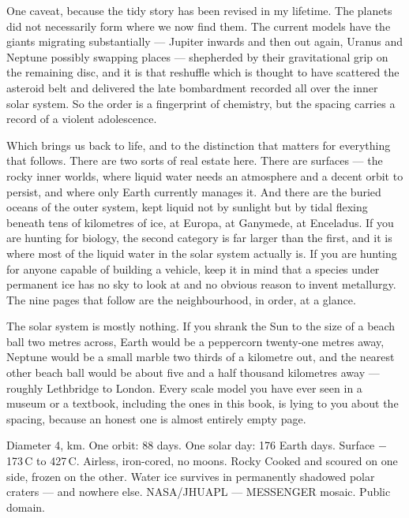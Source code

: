 One caveat, because the tidy story has been revised in my lifetime. The planets did not
necessarily form where we now find them. The current models have the giants migrating
substantially --- Jupiter inwards and then out again, Uranus and Neptune possibly swapping
places --- shepherded by their gravitational grip on the remaining disc, and it is that
reshuffle which is thought to have scattered the asteroid belt and delivered the late
bombardment recorded all over the inner solar system. So the order is a fingerprint of
chemistry, but the spacing carries a record of a violent adolescence.

Which brings us back to life, and to the distinction that matters for everything that follows.
There are two sorts of real estate here. There are surfaces --- the rocky inner worlds, where
liquid water needs an atmosphere and a decent orbit to persist, and where only Earth currently
manages it. And there are the buried oceans of the outer system, kept liquid not by sunlight
but by tidal flexing beneath tens of kilometres of ice, at Europa, at Ganymede, at Enceladus.
If you are hunting for biology, the second category is far larger than the first, and it is
where most of the liquid water in the solar system actually is. If you are hunting for anyone
capable of building a vehicle, keep it in mind that a species under permanent ice has no sky
to look at and no obvious reason to invent metallurgy. The nine pages that follow are the
neighbourhood, in order, at a glance.

\begin{funfact}
The solar system is mostly nothing. If you shrank the Sun to the size of a beach ball two
metres across, Earth would be a peppercorn twenty-one metres away, Neptune would be a small
marble two thirds of a kilometre out, and the nearest other beach ball would be about five and
a half thousand kilometres away --- roughly Lethbridge to London. Every scale model you have
ever seen in a museum or a textbook, including the ones in this book, is lying to you about the
spacing, because an honest one is almost entirely empty page.
\end{funfact}

{Diameter 4, km. One orbit: 88 days. One solar day: 176 Earth days. Surface
$-$173\,\textdegree C to 427\,\textdegree C. Airless, iron-cored, no moons.}
{Rocky}
{Cooked and scoured on one side, frozen on the other. Water ice survives in permanently
shadowed polar craters --- and nowhere else.}
{NASA/JHUAPL --- MESSENGER mosaic. Public domain.}

